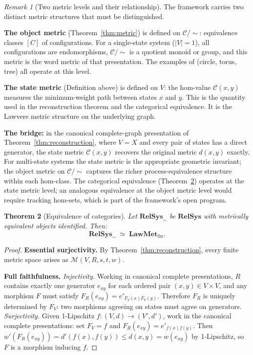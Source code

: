 \documentclass{article}
\newtheorem{theorem}{Theorem}[section]
\theoremstyle{definition}
\theoremstyle{remark}
\newtheorem{remark}[theorem]{Remark}
\newcommand{\RC}{\mathcal{C}}
\begin{document}
\begin{remark}[Two metric levels and their relationship]
\label{rem:twometrics}
The framework carries two distinct metric structures that
must be distinguished.

\textbf{The object metric} (Theorem~\ref{thm:metric}) is defined
on $\RC/{\sim}$: equivalence classes $[C]$ of configurations.
For a single-state system ($|V| = 1$), all configurations are
endomorphisms, $\RC/{\sim}$ is a quotient monoid or group, and
this metric is the word metric of that presentation. The examples
of  (circle, torus, tree) all operate at
this level.

\textbf{The state metric} (Definition above) is defined on $V$:
the hom-value $\mathcal{C}(x,y)$ measures the minimum-weight
path between states $x$ and $y$. This is the quantity used in
the reconstruction theorem and the categorical equivalence. It
is the Lawvere metric structure on the underlying graph.

\textbf{The bridge:} in the canonical complete-graph presentation
of Theorem~\ref{thm:reconstruction}, where $V = X$ and every
pair of states has a direct generator, the state metric
$\mathcal{C}(x,y)$ recovers the original metric $d(x,y)$
exactly. For multi-state systems the state metric is the
appropriate geometric invariant; the object metric on $\RC/{\sim}$
captures the richer process-equivalence structure within each
hom-class. The categorical equivalence
(Theorem~\ref{thm:equivalence}) operates at the state metric
level; an analogous equivalence at the object metric level
would require tracking hom-sets, which is part of the
framework's open program.
\end{remark}

\begin{theorem}[Equivalence of categories]
\label{thm:equivalence}
Let $\mathbf{RelSys}_\sim$ be $\mathbf{RelSys}$ with metrically
equivalent objects identified. Then:
\[
  \mathbf{RelSys}_\sim \;\simeq\; \mathbf{LawMet}_{\mathrm{fin}}.
\]
\end{theorem}

\begin{proof}
\textbf{Essential surjectivity.} By Theorem~\ref{thm:reconstruction},
every finite metric space arises as $\mathcal{M}(V, R, s, t, w)$.

\textbf{Full faithfulness.} \textit{Injectivity.} Working in
canonical complete presentations, $R$ contains exactly one generator
$e_{xy}$ for each ordered pair $(x,y) \in V \times V$, and any
morphism $F$ must satisfy $F_R(e_{xy}) = e'_{F_V(x)F_V(y)}$.
Therefore $F_R$ is uniquely determined by $F_V$: two morphisms
agreeing on states must agree on generators.
\textit{Surjectivity.} Given 1-Lipschitz
$f : (V, d) \to (V', d')$, work in the canonical complete
presentations: set $F_V = f$ and $F_R(e_{xy}) = e'_{f(x)f(y)}$.
Then $w'(F_R(e_{xy})) = d'(f(x),f(y)) \leq d(x,y) = w(e_{xy})$
by 1-Lipschitz, so $F$ is a morphism inducing $f$.
\end{proof}
\end{document}
